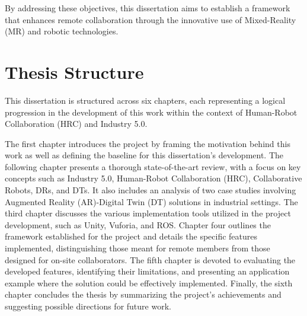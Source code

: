 By addressing these objectives, this dissertation aims to establish a framework that enhances remote collaboration through the innovative use 
of Mixed-Reality (\ac{MR}) and robotic technologies.



\section{Thesis Structure}
% 

This dissertation is structured across six chapters, each representing a logical progression in the development of this work within the context of Human-Robot Collaboration (\ac{HRC}) and Industry 5.0.

The first chapter introduces the project by framing the motivation behind this work as well as defining the baseline for this dissertation's development. The following chapter presents a thorough state-of-the-art review, with a focus on key concepts such as Industry 5.0, Human-Robot Collaboration (\ac{HRC}), Collaborative Robots, \ac{DRs}, and \ac{DTs}. It also includes an analysis of two case studies involving Augmented Reality (\ac{AR})-Digital Twin (\ac{DT}) solutions in industrial settings. The third chapter discusses the various implementation tools utilized in the project development, such as Unity, Vuforia, and ROS.
Chapter four outlines the framework established for the project and details the specific features implemented, distinguishing those meant for remote members from those designed for on-site collaborators. The fifth chapter is devoted to evaluating the developed features, identifying their limitations, and presenting an application example where the solution could be effectively implemented. Finally, the sixth chapter concludes the thesis by summarizing the project's achievements and suggesting possible directions for future work.



